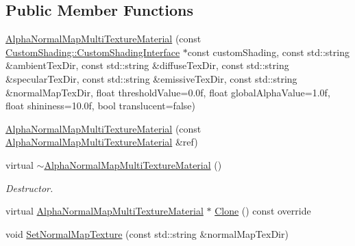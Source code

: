 \subsection*{Public Member Functions}
\begin{DoxyCompactItemize}
\item 
\mbox{\hyperlink{class_geometry_engine_1_1_geometry_material_1_1_alpha_normal_map_multi_texture_material_a28d43b503397e430804bca66fd4a0322}{Alpha\+Normal\+Map\+Multi\+Texture\+Material}} (const \mbox{\hyperlink{class_geometry_engine_1_1_custom_shading_1_1_custom_shading_interface}{Custom\+Shading\+::\+Custom\+Shading\+Interface}} $\ast$const custom\+Shading, const std\+::string \&ambient\+Tex\+Dir, const std\+::string \&diffuse\+Tex\+Dir, const std\+::string \&specular\+Tex\+Dir, const std\+::string \&emissive\+Tex\+Dir, const std\+::string \&normal\+Map\+Tex\+Dir, float threshold\+Value=0.\+0f, float global\+Alpha\+Value=1.\+0f, float shininess=10.\+0f, bool translucent=false)
\item 
\mbox{\hyperlink{class_geometry_engine_1_1_geometry_material_1_1_alpha_normal_map_multi_texture_material_ac1010d4b924ed26b0a7570d855abfb25}{Alpha\+Normal\+Map\+Multi\+Texture\+Material}} (const \mbox{\hyperlink{class_geometry_engine_1_1_geometry_material_1_1_alpha_normal_map_multi_texture_material}{Alpha\+Normal\+Map\+Multi\+Texture\+Material}} \&ref)
\item 
\mbox{\label{class_geometry_engine_1_1_geometry_material_1_1_alpha_normal_map_multi_texture_material_a7757245795e387930803ceceecdc29ff}} 
virtual \mbox{\hyperlink{class_geometry_engine_1_1_geometry_material_1_1_alpha_normal_map_multi_texture_material_a7757245795e387930803ceceecdc29ff}{$\sim$\+Alpha\+Normal\+Map\+Multi\+Texture\+Material}} ()
\begin{DoxyCompactList}\small\item\em Destructor. \end{DoxyCompactList}\item 
virtual \mbox{\hyperlink{class_geometry_engine_1_1_geometry_material_1_1_alpha_normal_map_multi_texture_material}{Alpha\+Normal\+Map\+Multi\+Texture\+Material}} $\ast$ \mbox{\hyperlink{class_geometry_engine_1_1_geometry_material_1_1_alpha_normal_map_multi_texture_material_afa328c24595fe1456e87db7ad6df2759}{Clone}} () const override
\item 
void \mbox{\hyperlink{class_geometry_engine_1_1_geometry_material_1_1_alpha_normal_map_multi_texture_material_aeb7a6dd47e712e0d6c85d37e7158a615}{Set\+Normal\+Map\+Texture}} (const std\+::string \&normal\+Map\+Tex\+Dir)

\end{DoxyCompactItemize}
